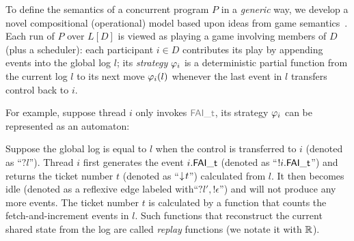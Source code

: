 To define the semantics of a concurrent program $P$ in a {\em generic}
way, we develop a novel compositional (operational) model based upon
ideas from game semantics~\cite{gsinvite}. Each run of
$P$ over $L[D]$ is viewed as playing a game involving members of
$D$ (plus a scheduler): each participant $i\in{}D$ contributes its
play by appending events into the global log $l$; its {\em strategy}
$\varphi_{i}$ is a deterministic partial function from
the current log $l$ to its next move $\varphi_{i}(l)$ whenever
the last event in $l$ transfers control back to $i$.


For example, suppose thread $i$ only invokes  $\commc{FAI\_t}$, its strategy $\varphi_{i}$  can be represented as an automaton:%
\begin{center}
\end{center}%
Suppose the global log is equal to $l$ when the control is transferred to $i$  (denoted as ``$?l$''). Thread $i$  first generates the event
$i.\mathsf{\textcolor{black}{FAI\_t}}$ (denoted as ``$!i.\mathsf{\textcolor{black}{FAI\_t}}$'') and returns the ticket number $t$ (denoted as ``$\downarrow\! t$'') calculated from $l$. It then becomes idle (denoted as a reflexive edge labeled with``$?l',!\epsilon$'')
and will not produce any more events.
The ticket number $t$ is calculated by a  function that counts the fetch-and-increment events in $l$. Such functions that reconstruct the current shared state from the log are called \emph{replay} functions (we notate it with $\mathbb{R}$).

